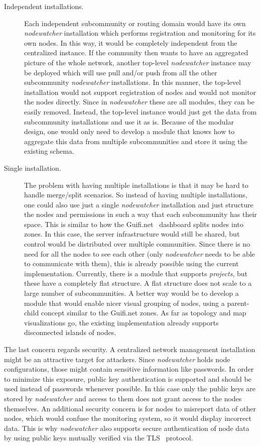 \documentclass[5p,sort&compress]{elsarticle}
\newcommand{\nodewatcher}{\textit{nodewatcher}}
\begin{document}
\begin{description}
    \item[Independent installations.] Each independent subcommunity or routing domain would have its own \nodewatcher{} installation which performs registration and monitoring for its own nodes.
    In this way, it would be completely independent from the centralized instance.
    If the community then wants to have an aggregated picture of the whole network, another top-level \nodewatcher{} instance may be deployed which will use pull and/or push from all the other subcommunity \nodewatcher{} installations.
    In this manner, the top-level installation would not support registration of nodes and would not monitor the nodes directly.
    Since in \nodewatcher{} these are all modules, they can be easily removed.
    Instead, the top-level instance would just get the data from subcommunity installations and use it as is.
    Because of the modular design, one would only need to develop a module that knows how to aggregate this data from multiple subcommunities and store it using the existing schema.

    \item[Single installation.] The problem with having multiple installations is that it may be hard to handle merge/split scenarios.
    So instead of having multiple installations, one could also use just a single \nodewatcher{} installation and just structure the nodes and permissions in such a way that each subcommunity has their space.
    This is similar to how the Guifi.net~\cite{Guifinode_2003,Vega_2012} dashboard splits nodes into zones.
    In this case, the server infrastructure would still be shared, but control would be distributed over multiple communities.
    Since there is no need for all the nodes to see each other (only \nodewatcher{} needs to be able to communicate with them), this is already possible using the current implementation.
    Currently, there is a module that supports \textit{projects}, but these have a completely flat structure.
    A flat structure does not scale to a large number of subcommunities.
    A better way would be to develop a module that would enable nicer visual grouping of nodes, using a parent-child concept similar to the Guifi.net zones.
    As far as topology and map visualizations go, the existing implementation already supports disconnected islands of nodes.
\end{description}

The last concern regards security.
A centralized network management installation might be an attractive target for attackers.
Since \nodewatcher{} holds node configurations, those might contain sensitive information like passwords.
In order to minimize this exposure, public key authentication is supported and should be used instead of passwords whenever possible.
In this case only the public keys are stored by \nodewatcher{} and access to them does not grant access to the nodes themselves.
An additional security concern is for nodes to misreport data of other nodes, which would confuse the monitoring system, so it would display incorrect data.
This is why \nodewatcher{} also supports secure authentication of node data by using public keys mutually verified via the TLS~\cite{RFC_5246} protocol.
\end{document}
